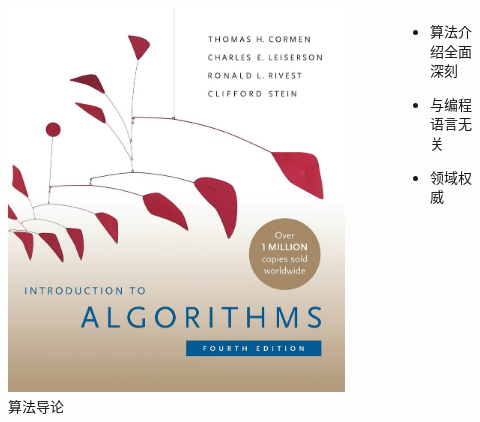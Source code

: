 \begin{frame}{\insertsubsectionhead}
    \begin{columns}
        \vspace{4ex}
        \begin{figure}
            \centering
            \includegraphics[height=0.6\textheight]{images/cormen2022introduction.jpg}
            \caption{算法导论\cite{cormen2022introduction}}
            \label{fig:cormen2022introduction}
        \end{figure}
        \begin{itemize}
            \item 算法介绍全面深刻
            \item 与编程语言无关
            \item 领域权威
        \end{itemize}
    \end{columns}
\end{frame}

